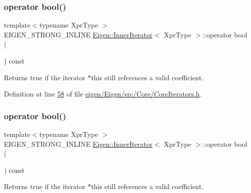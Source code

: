 \subsubsection{\texorpdfstring{operator bool()}{operator bool()}\hspace{0.1cm}{\footnotesize\ttfamily [1/2]}}
{\footnotesize\ttfamily template$<$typename Xpr\+Type $>$ \\
E\+I\+G\+E\+N\+\_\+\+S\+T\+R\+O\+N\+G\+\_\+\+I\+N\+L\+I\+NE \hyperlink{class_eigen_1_1_inner_iterator}{Eigen\+::\+Inner\+Iterator}$<$ Xpr\+Type $>$\+::operator bool (\begin{DoxyParamCaption}{ }\end{DoxyParamCaption}) const\hspace{0.3cm}{\ttfamily [inline]}}

\begin{DoxyReturn}{Returns}
{\ttfamily true} if the iterator {\ttfamily $\ast$this} still references a valid coefficient. 
\end{DoxyReturn}


Definition at line \hyperlink{eigen_2_eigen_2src_2_core_2_core_iterators_8h_source_l00058}{58} of file \hyperlink{eigen_2_eigen_2src_2_core_2_core_iterators_8h_source}{eigen/\+Eigen/src/\+Core/\+Core\+Iterators.\+h}.

\mbox{\label{class_eigen_1_1_inner_iterator_a0f11df2dfcd1c48c54aa29e605c09310}} 
\subsubsection{\texorpdfstring{operator bool()}{operator bool()}\hspace{0.1cm}{\footnotesize\ttfamily [2/2]}}
{\footnotesize\ttfamily template$<$typename Xpr\+Type $>$ \\
E\+I\+G\+E\+N\+\_\+\+S\+T\+R\+O\+N\+G\+\_\+\+I\+N\+L\+I\+NE \hyperlink{class_eigen_1_1_inner_iterator}{Eigen\+::\+Inner\+Iterator}$<$ Xpr\+Type $>$\+::operator bool (\begin{DoxyParamCaption}{ }\end{DoxyParamCaption}) const\hspace{0.3cm}{\ttfamily [inline]}}

\begin{DoxyReturn}{Returns}
{\ttfamily true} if the iterator {\ttfamily $\ast$this} still references a valid coefficient. 
\end{DoxyReturn}


